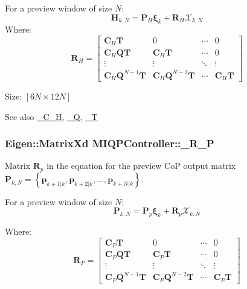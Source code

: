 \-For a preview window of size $N$\-: \[ \mathbf{H}_{k,N} = \mathbf{P}_H \mathbf{\xi}_k + \mathbf{R}_H \mathcal{X}_{k,N} \] \-Where\-: \[ \mathbf{R}_H = \left[\begin{array}{cccc} \mathbf{C}_H\mathbf{T} & 0 & \cdots & 0 \\ \mathbf{C}_H\mathbf{Q}\mathbf{T} & \mathbf{C}_H\mathbf{T} & \cdots & 0 \\ \vdots & \vdots & \ddots & \vdots \\ \mathbf{C}_H\mathbf{Q}^{N-1}\mathbf{T} & \mathbf{C}_H\mathbf{Q}^{N-2}\mathbf{T} & \cdots & \mathbf{C}_H\mathbf{T} \end{array}\right] \]

\-Size\-: $[6N\times12N]$ \begin{DoxySeeAlso}{\-See also}
\hyperlink{classMIQPController_a323718c0eaf8c8a7e159ea7f1ef5b72c}{\-\_\-\-C\-\_\-\-H}, \hyperlink{classMIQPController_ac6404f74d6002d6a0ca4bd2d0b41d548}{\-\_\-\-Q}, \hyperlink{classMIQPController_a1143455ae85d0e221578dbe5d659af1d}{\-\_\-\-T} 
\end{DoxySeeAlso}
\hypertarget{classMIQPController_a7cede44e7827c9b4b12f2549714f3adf}{
\subsubsection[{\-\_\-\-R\-\_\-\-P}]{\setlength{\rightskip}{0pt plus 5cm}\-Eigen\-::\-Matrix\-Xd {\bf \-M\-I\-Q\-P\-Controller\-::\-\_\-\-R\-\_\-\-P}}}\label{classMIQPController_a7cede44e7827c9b4b12f2549714f3adf}
\-Matrix $\mathbf{R}_p$ in the equation for the preview \-Co\-P output matrix $\mathbf{P}_{k,N} = \left\{ \mathbf{p}_{k+1|k}, \mathbf{p}_{k+2|k}, \dots, \mathbf{p}_{k+N|k} \right\}$.

\-For a preview window of size $N$\-: \[ \mathbf{P}_{k,N} = \mathbf{P}_p \mathbf{\xi}_k + \mathbf{R}_p \mathcal{X}_{k,N} \]

\-Where\-: \[ \mathbf{R}_P = \left[\begin{array}{cccc} \mathbf{C}_P\mathbf{T} & 0 & \cdots & 0 \\ \mathbf{C}_P\mathbf{Q}\mathbf{T} & \mathbf{C}_P\mathbf{T} & \cdots & 0 \\ \vdots & \vdots & \ddots & \vdots \\ \mathbf{C}_P\mathbf{Q}^{N-1}\mathbf{T} & \mathbf{C}_P\mathbf{Q}^{N-2}\mathbf{T} & \cdots & \mathbf{C}_P\mathbf{T} \end{array}\right] \]

